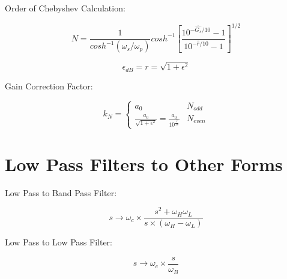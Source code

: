\documentclass{article}
\begin{document}
Order of Chebyshev Calculation:

$$N = \frac{1}{cosh^{-1}(\omega_{s}/\omega_{p})}cosh^{-1}\left[\frac{10^{-\hat{G_{s}}/10}-1}{10^{-\hat{r}/10}-1}\right]^{1/2}$$

$$\epsilon_{dB} = r = \sqrt{1 + \epsilon^{2}}$$

Gain Correction Factor:

$$k_N = \begin{cases} 
    a_0 & N_{odd}\\ 
    \frac{a_0}{\sqrt{1+ \epsilon^2}} = \frac{a_0}{10^{\frac{\hat{r}}{20}}} & N_{even}
\end{cases}
$$

\section{Low Pass Filters to Other Forms}

Low Pass to Band Pass Filter:

$$s \rightarrow \omega_c \times \frac{s^2 + \omega_H \omega_L}{s\times (\omega_H - \omega_L)}$$

Low Pass to Low Pass Filter:

$$s \rightarrow \omega_c \times \frac{s}{\omega_B}$$
\end{document}
